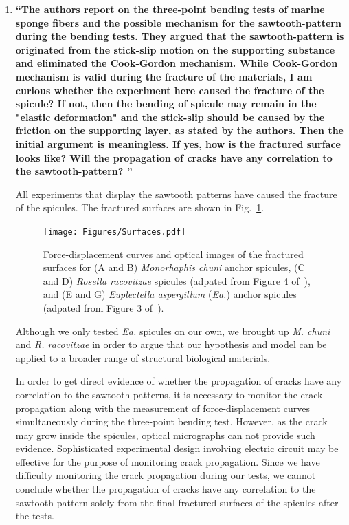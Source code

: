 \documentclass[11pt,letterpaper]{report}
\begin{document}
\begin{enumerate}[label=\textit{1.\arabic*},wide, labelwidth=!, labelindent=0pt]
\begin{enumerate}[label=\textit{2.\arabic*},wide, labelindent=0pt]

\item \label{r2c1}{\bf ``The authors report on the three-point bending tests of marine sponge fibers and the possible mechanism for the sawtooth-pattern during the bending tests. They argued that the sawtooth-pattern is originated from the stick-slip motion on the supporting substance and eliminated the Cook-Gordon mechanism.
While Cook-Gordon mechanism is valid during the fracture of the materials, I am curious whether the experiment here caused the fracture of the spicule?
If not, then the bending of spicule may remain in the "elastic deformation" and the stick-slip should be caused by the friction on the supporting layer, as stated by the authors. Then the initial argument is meaningless.
If yes, how is the fractured surface looks like? Will the propagation of cracks have any correlation to the sawtooth-pattern? ''}


All experiments that display the sawtooth patterns have caused the fracture of the spicules.
The fractured surfaces are shown in Fig.~\ref{fig:Surfaces}.

\begin{figure}[H]
\centering
\texttt{[image: Figures/Surfaces.pdf]}
\caption{Force-displacement curves and optical images of the fractured surfaces for (A and B) \textit{Monorhaphis chuni} anchor spicules, (C and D) \textit{Rosella racovitzae} spicules (adpated from Figure 4 of~\cite{kochiyama2021sawtooth}), and (E and G) \textit{Euplectella aspergillum} (\textit{Ea.}) anchor spicules (adpated from Figure 3 of~\cite{monn2017enhanced}).
}
\label{fig:Surfaces}
\end{figure}

Although we only tested \textit{Ea.} spicules on our own, we brought up \textit{M. chuni} and \textit{R. racovitzae} in order to argue that our hypothesis and model can be applied to a broader range of structural biological materials.

In order to get direct evidence of whether the propagation of cracks have any correlation to the sawtooth patterns, it is necessary to monitor the crack propagation along with the measurement of force-displacement curves simultaneously during the three-point bending test. However, as the crack may grow inside the spicules, optical micrographs can not provide such evidence. Sophisticated experimental design involving electric circuit may be effective for the purpose of monitoring crack propagation.
Since we have difficulty monitoring the crack propagation during our tests, we cannot conclude whether the propagation of cracks have any correlation to the sawtooth pattern solely from the final fractured surfaces of the spicules after the tests.




\end{enumerate}
\end{enumerate}
\end{document}
